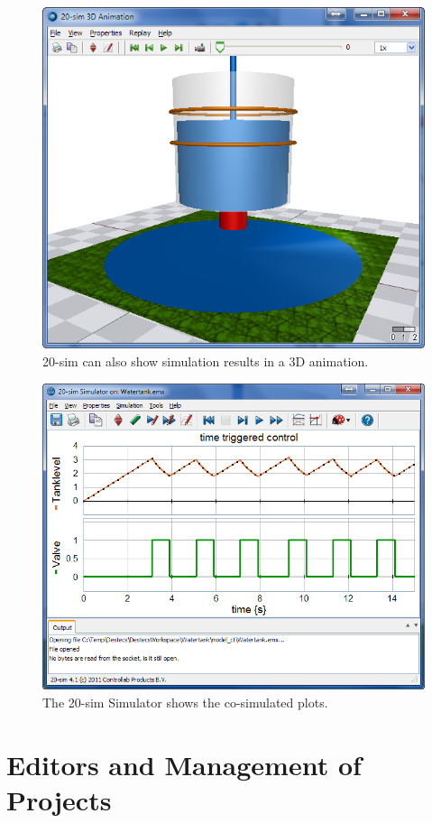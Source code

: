 \documentclass{crescendorepchap}
\begin{document}
\begin{figure}[htbp]
\centering
\includegraphics[width=.9\textwidth]{images/20simAnimationWaterTank.png}
\caption{20-sim can also show simulation results in a 3D animation.\label{fig:water3Dani}}
\end{figure}


\begin{figure}[htbp]
\centering
\includegraphics[width=.9\textwidth]{images/20simSimulatorWaterTank.png}
\caption{The 20-sim Simulator shows the co-simulated plots.\label{fig:watercosimplot}}
\end{figure}

\chapter{Editors and Management of Projects}\label{chap:basic}
\end{document}
